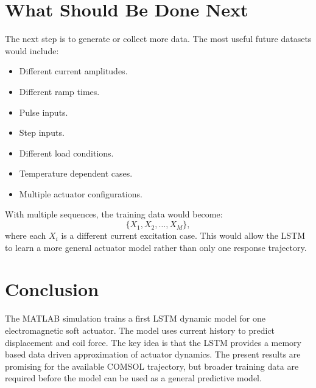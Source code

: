 \documentclass[11pt]{article}
\begin{document}
\section{What Should Be Done Next}

The next step is to generate or collect more data. The most useful future datasets would include:
\begin{itemize}[leftmargin=1.2cm]
    \item Different current amplitudes.
    \item Different ramp times.
    \item Pulse inputs.
    \item Step inputs.
    \item Different load conditions.
    \item Temperature dependent cases.
    \item Multiple actuator configurations.
\end{itemize}

With multiple sequences, the training data would become:
\[
    \{X_1, X_2, \ldots, X_M\},
\]
where each \(X_i\) is a different current excitation case. This would allow the LSTM to learn a more general actuator model rather than only one response trajectory.

\section{Conclusion}

The MATLAB simulation trains a first LSTM dynamic model for one electromagnetic soft actuator. The model uses current history to predict displacement and coil force. The key idea is that the LSTM provides a memory based data driven approximation of actuator dynamics. The present results are promising for the available COMSOL trajectory, but broader training data are required before the model can be used as a general predictive model.
\end{document}
